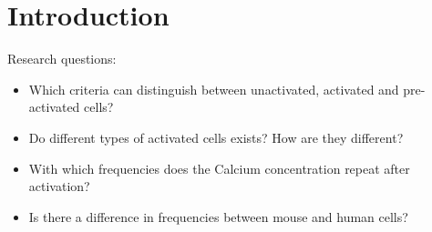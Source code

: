 \chapter{Introduction}
\label{chapter:introduction}

Research questions:
\begin{itemize}
	\item Which criteria can distinguish between unactivated, activated and pre-activated cells?
	\item Do different types of activated cells exists? How are they different?
	\item With which frequencies does the Calcium concentration repeat after activation?
	\item Is there a difference in frequencies between mouse and human cells?
\end{itemize}


